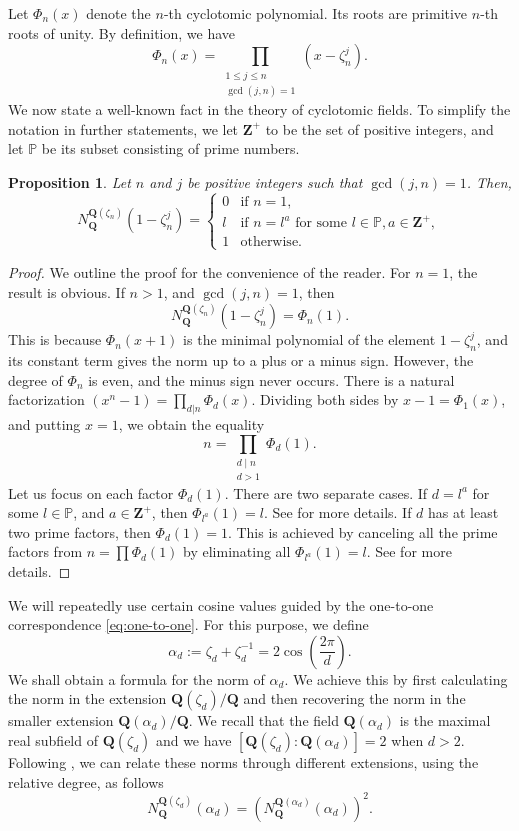 \documentclass{amsart}
\newcommand{\Q}{\mathbf Q}
\newcommand{\Z}{\mathbf Z}
\newcommand{\norm}[2]{N_{#1}^{#2}}
\newcommand{\cycl}[1]{\Q(\zeta_{#1})}
\numberwithin{equation}{section}
\theoremstyle{plain}
\newtheorem{proposition}[theorem]{Proposition}
\theoremstyle{definition}
\begin{document}
Let $\Phi_n(x)$ denote the $n$-th cyclotomic polynomial. Its roots are primitive $n$-th roots of unity. By definition, we have
$$
\Phi_n(x)=\prod_{\substack{1\leq j\leq n\\\gcd(j,n)=1}}\left(x-\zeta_n^j\right).
$$
We now state a well-known fact in the theory of cyclotomic fields. To simplify the notation in further statements, we let $\Z^{+}$ to be the set of positive integers, and let $\mathbb{P}$ be its subset consisting of prime numbers. 
\begin{proposition}\label{prop:norm}
	Let $n$ and $j$ be positive integers such that $\gcd(j,n)=1$. Then,
	$$
	\norm{\Q}{\cycl{n}}\left(1-\zeta_n^j\right)=
	\begin{cases}
		0 & \text{if } n=1, \\
		l & \text{if } n=l^a \text{ for some } l\in\mathbb{P},  a \in \Z^{+}, \\
		1 & \text{otherwise}.
	\end{cases}
	$$
\end{proposition}
\begin{proof} We outline the proof for the convenience of the reader. For $n=1$, the result is obvious. If $n>1$, and $\gcd(j,n)=1$, then 
\[\norm{\Q}{\cycl{n}}\left(1-\zeta_n^j\right) =\Phi_n(1). \]	
This is because $\Phi_n(x+1)$ is the minimal polynomial of the element $1-\zeta_n^j$, and its constant term gives the norm up to a plus or a minus sign. However, the degree of $\Phi_n$ is even, and the minus sign never occurs. There is a natural factorization $(x^n - 1) = \prod_{d|n} \Phi_d(x)$.
Dividing both sides by $x-1=\Phi_1(x)$, and putting $x=1$, we obtain the equality
$$n=\prod_{\substack{d\mid n\\d>1}}\Phi_d(1).$$ 
Let us focus on each factor $\Phi_d(1)$. There are two separate cases. If $d=l^a$ for some $l\in\mathbb{P}$, and $a \in \Z^{+}$, then $\Phi_{l^a}(1)=l$. See \cite[Chapter~2]{marcus2018} for more details. If $d$ has at least two prime factors, then $\Phi_{d}(1)=1$. This is achieved by canceling all the prime factors from $n=\prod\Phi_d(1)$ by eliminating all $\Phi_{l^a}(1)=l$. See \cite[Proposition~2.8]{washingtoncyclotomic1997} for more details.
\end{proof}

We will repeatedly use certain cosine values guided by the one-to-one correspondence \eqref{eq:one-to-one}. For this purpose, we define 
$$\alpha_d:=\zeta_d + \zeta_d^{-1}=2\cos\left(\frac{2\pi}{d}\right).$$
We shall obtain a formula for the norm of $\alpha_d$. We achieve this by first calculating the norm in the extension $\cycl{d}/\Q$ and then recovering the norm in the smaller extension $\Q(\alpha_d)/\Q$. We recall that the field $\Q(\alpha_d)$ is the maximal real subfield of $\cycl{d}$ and we have $[\cycl{d}:\Q(\alpha_d)]=2$ when $d > 2$. Following \cite[Chapter~2]{marcus2018}, we can relate these norms through different extensions, using the relative degree, as follows 
\begin{equation}\label{eq:norminextension}
N_{\Q}^{\cycl{d}}(\alpha_d) = \left( N_{\Q}^{\Q(\alpha_d)}(\alpha_d) \right)^2.	
\end{equation}
\end{document}
